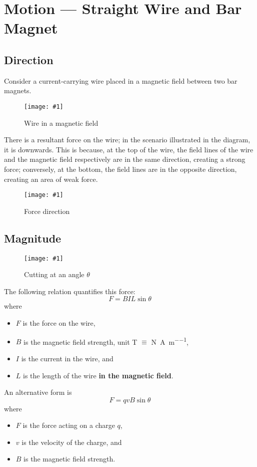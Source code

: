 \documentclass[a4paper,12pt]{article}
\let\oldsection\section
\renewcommand\section{\clearpage\oldsection}
\let\oldsi\si
\renewcommand{\si}[1]{\oldsi[per-mode=reciprocal-positive-first]{#1}}
\newcommand{\img}[4]{\begin{center}
  \begin{figure}[H]
    \centering
    \texttt{[image: \#1]}
    \caption{#3}
    \label{fig:#4}
  \end{figure}
\end{center}}
\begin{document}
\pagebreak

\section{Motion --- Straight Wire and Bar Magnet}

\subsection{Direction}

Consider a current-carrying wire placed in a magnetic field between two bar magnets.

\img{wireinmagneticfield.jpg}{0.6}{Wire in a magnetic field}{wireinmagneticfield}

There is a resultant force on the wire; in the scenario illustrated in the diagram, it is downwards. This is because, at the top of the wire, the field lines of the wire and the magnetic field respectively are in the same direction, creating a strong force; conversely, at the bottom, the field lines are in the opposite direction, creating an area of weak force.

\img{wireinmagneticfield_1.png}{0.6}{Force direction}{force}

\subsection{Magnitude}

\img{wireinmagneticfield_angle.png}{0.35}{Cutting at an angle $\theta$}{force}

The following relation quantifies this force:
\begin{equation}\label{eq:BIL}
  F = BIL\sin\theta
\end{equation}
where
\begin{itemize}
  \item $F$ is the force on the wire,
  \item $B$ is the magnetic field strength, unit \si{\tesla} $\equiv$ \si{\newton\per\ampere\per\metre},
  \item $I$ is the current in the wire, and
  \item $L$ is the length of the wire \textbf{in the magnetic field}.
\end{itemize}
An alternative form is
\begin{equation}\label{eq:BIL2}
  F = qvB\sin\theta
\end{equation}
where
\begin{itemize}
  \item $F$ is the force acting on a charge $q$,
  \item $v$ is the velocity of the charge, and
  \item $B$ is the magnetic field strength.
\end{itemize}
\end{document}
